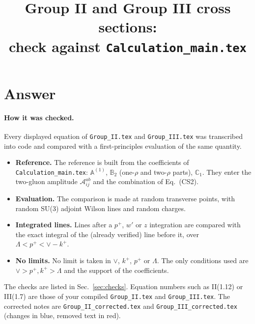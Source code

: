 \documentclass[10pt]{article}
\title{Group II and Group III cross sections:\\ check against \texttt{Calculation\_main.tex}}
\date{}
\numberwithin{equation}{section}
\def\mf#1{\mathbb{#1}}
\begin{document}
\maketitle
\tableofcontents

\section{Answer}\label{sec:answer}
\paragraph{How it was checked.} Every displayed equation of \texttt{Group\_II.tex} and \texttt{Group\_III.tex} was transcribed into code and compared with a first-principles evaluation of the same quantity.
\begin{itemize}
\item \textbf{Reference.} The reference is built from the coefficients of \texttt{Calculation\_main.tex}: $\mf A^{(1)}$, $\mf B_2$ (one-$\rho$ and two-$\rho$ parts), $\mf C_1$. They enter the two-gluon amplitude $\mathcal A^{ab}_{ij}$ and the combination of Eq.~(CS2).
\item \textbf{Evaluation.} The comparison is made at random transverse points, with random SU(3) adjoint Wilson lines and random charges.
\item \textbf{Integrated lines.} Lines after a $p^+$, $w'$ or $z$ integration are compared with the exact integral of the (already verified) line before it, over $\Lambda<p^+<\vee-k^+$.
\item \textbf{No limits.} No limit is taken in $\vee$, $k^+$, $p^+$ or $\Lambda$. The only conditions used are $\vee>p^+,k^+>\Lambda$ and the support of the coefficients.
\end{itemize}
The checks are listed in Sec.~\ref{sec:checks}. Equation numbers such as II(1.12) or III(1.7) are those of your compiled \texttt{Group\_II.tex} and \texttt{Group\_III.tex}. The corrected notes are \texttt{Group\_II\_corrected.tex} and \texttt{Group\_III\_corrected.tex} (changes in blue, removed text in red).
\end{document}
